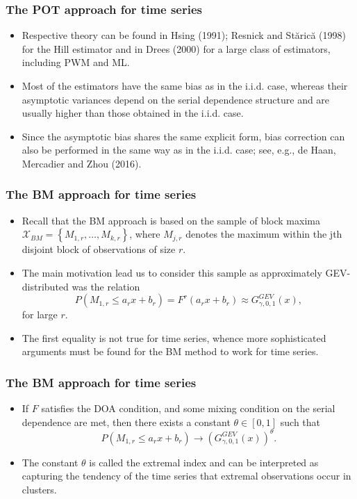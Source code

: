 \documentclass{beamer}
\newcommand{\suit}[1]{\left(#1\right)}
\newcommand{\set}[1]{\left\{#1\right\}}
\begin{document}
\begin{frame}
    \frametitle{The POT approach for time series}
\begin{itemize}
    \item Respective theory can be found in Hsing (1991); Resnick and Stărică (1998) for the Hill estimator and in Drees (2000) for a large class of estimators, including PWM and ML.
    \item Most of the
    estimators have the same bias as in the i.i.d. case, whereas their asymptotic variances depend
    on the serial dependence structure and are usually higher than those obtained in the i.i.d. case.
    \item Since the asymptotic bias shares the same explicit form, bias correction can also be performed
    in the same way as in the i.i.d. case; see, e.g., de Haan, Mercadier and Zhou (2016).
\end{itemize}
    

\end{frame}

\begin{frame}
    \frametitle{The BM approach for time series}
\begin{itemize}
    \item Recall that the BM approach is based on the sample of block maxima $\mathcal{X}_{BM}=\set{M_{1,r},\dots,M_{k,r}}$, where $M_{j,r}$ denotes the maximum within the jth disjoint block of observations of size $r$.
    \item The main
    motivation lead us to consider this sample as approximately GEV-distributed   was the relation
    $$
P\suit{M_{1,r}\le a_r x+b_r}=F^r(a_r x+b_r)\approx G^{GEV}_{\gamma,0,1}(x),
    $$
    for large $r$. 
    \item The first equality is not true for time series, whence more sophisticated arguments
    must be found for the BM method to work for time series.
\end{itemize}
    

\end{frame}

\begin{frame}
    \frametitle{The BM approach for time series}
\begin{itemize}
    \item   If $F$ satisfies the DOA condition, and some mixing condition on the serial dependence are met, then there exists a constant $\theta \in[0,1]$ such that
    $$
    P\suit{M_{1,r}\le a_r x+b_r}\to\suit{G^{GEV}_{\gamma,0,1}(x)}^{\theta}.
    $$
     \item The constant $\theta$ is called the extremal index and can be interpreted as capturing the tendency of the time series that extremal observations occur in clusters.
\end{itemize}
    

\end{frame}
\end{document}
